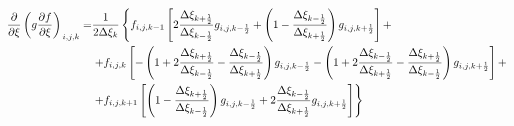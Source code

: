 \begin{equation*}
    \begin{split}
        \left.
            \frac
                {\partial}
                {\partial \xi}
            \left(
                g
                \frac
                    {\partial f}
                    {\partial \xi}
            \right)
        \right._{i, j, k}
        = &
        \frac
            {1}
            {
                2
                \Delta \xi_{k}
            }
        \left\{
            f_{i, j, k - 1}
            \left[
                2
                \frac
                    {\Delta \xi_{k + \frac{1}{2}}}
                    {\Delta \xi_{k - \frac{1}{2}}}
                g_{i, j, k-\frac{1}{2}}
                +
                \left(
                    1
                    -
                    \frac
                        {\Delta \xi_{k - \frac{1}{2}}}
                        {\Delta \xi_{k + \frac{1}{2}}}
                \right)
                g_{i, j, k+\frac{1}{2}}
            \right]
            +
        \right.
        \\ &
        \left.
            +
            f_{i, j, k}
            \left[
                -
                \left(
                    1
                    +
                    2
                    \frac
                        {\Delta \xi_{k + \frac{1}{2}}}
                        {\Delta \xi_{k - \frac{1}{2}}}
                    -
                    \frac
                        {\Delta \xi_{k - \frac{1}{2}}}
                        {\Delta \xi_{k + \frac{1}{2}}}
                \right)
                g_{i, j, k - \frac{1}{2}}
                -
                \left(
                    1
                    +
                    2
                    \frac
                        {\Delta \xi_{k - \frac{1}{2}}}
                        {\Delta \xi_{k + \frac{1}{2}}}
                    -
                    \frac
                        {\Delta \xi_{k + \frac{1}{2}}}
                        {\Delta \xi_{k - \frac{1}{2}}}
                \right)
                g_{i, j, k + \frac{1}{2}}
            \right]
            +
        \right.
        \\ &
        \left.
            +
            f_{i, j, k + 1}
            \left[
                \left(
                    1
                    -
                    \frac
                        {\Delta \xi_{k + \frac{1}{2}}}
                        {\Delta \xi_{k - \frac{1}{2}}}
                \right)
                g_{i, j, k - \frac{1}{2}}
                +
                2
                \frac
                    {\Delta \xi_{k - \frac{1}{2}}}
                    {\Delta \xi_{k + \frac{1}{2}}}
                g_{i, j, k + \frac{1}{2}}
            \right]
        \right\}
    \end{split}
\end{equation*}

